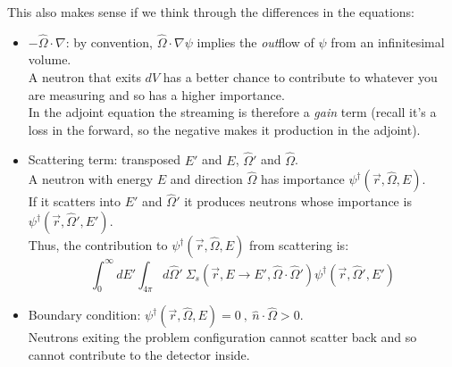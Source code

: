 \documentclass[12pt]{article}
\newcommand{\rvec}{\ensuremath{\vec{r}}}
\newcommand{\vOmega}{\ensuremath{\hat{\Omega}}}
\begin{document}
This also makes sense if we think through the differences in the equations:
\begin{itemize}
\item $-\vOmega \cdot \nabla$: by convention, $\vOmega \cdot \nabla \psi$ implies the \textit{out}flow of $\psi$ from an infinitesimal volume.\\
A neutron that exits $dV$ has a better chance to contribute to whatever you are measuring and so has a higher importance. \\
In the adjoint equation the streaming is therefore a \textit{gain} term (recall it's a loss in the forward, so the negative makes it production in the adjoint).
%
\item Scattering term: transposed $E'$ and $E$, $\vOmega'$ and $\vOmega$. \\
A neutron with energy $E$ and direction  $\vOmega$ has importance $\psi^{\dagger}(\rvec, \vOmega, E)$. \\
If it scatters into $E'$ and $\vOmega'$ it produces neutrons whose importance is $\psi^{\dagger}(\rvec, \vOmega', E')$.\\
Thus, the contribution to $\psi^{\dagger}(\rvec, \vOmega, E)$ from scattering is:
\[
\int_0^{\infty} dE' \int_{4\pi} d\vOmega' \:\Sigma_s(\rvec, E \rightarrow E', \vOmega \cdot \vOmega')\psi^{\dagger}(\rvec, \vOmega', E')
\]
\item Boundary condition: $\psi^{\dagger}(\rvec, \vOmega, E) = 0\:, \: \hat{n}\cdot \vOmega > 0$.\\
Neutrons exiting the problem configuration cannot scatter back and so cannot contribute to the detector inside. 
\end{itemize}
\end{document}

